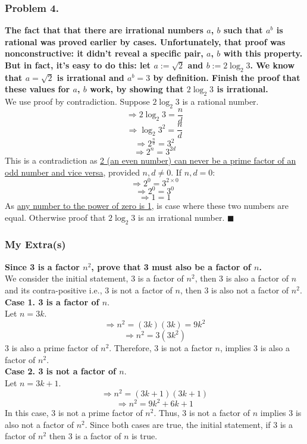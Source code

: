 \documentclass{article}
\begin{document}
\subsubsection{Problem 4.}
\textbf{The fact that that there are irrational numbers $a$, $b$ such that $a^{b}$ is rational was proved earlier by cases. Unfortunately, that proof was nonconstructive: it didn't reveal a specific pair, $a$, $b$ with this property. But in fact, it's easy to do this: let $a := \sqrt{2}$ and $b := 2\log_{2}3$. We know that $a = \sqrt{2}$ is irrational and $a^{b} = 3$ by definition. Finish the proof that these values for $a$, $b$ work, by showing that $2\log_{2}3$ is irrational.}
\\[5pt]
We use proof by contradiction. Suppose $2\log_{2}3$ is a rational number.
\[\Rightarrow 2\log_{2}3 = \frac{n}{d}\]
\[\Rightarrow \log_{2}3^{2} = \frac{n}{d}\]
\[\Rightarrow 2^{\frac{n}{d}} = 3^{2}\]
\[\Rightarrow 2^{n} = 3^{2d}\]
This is a contradiction as \href{https://en.wikipedia.org/wiki/Fundamental_theorem_of_arithmetic}{2 (an even number) can never be a prime factor of an odd number and vice versa}, provided $n, d \neq 0$. If $n, d = 0$: 
\[\Rightarrow 2^{0} = 3^{2 \times 0}\]
\[\Rightarrow 2^{0} = 3^{0}\]
\[\Rightarrow 1 = 1\]
As \href{https://www.homeschoolmath.net/teaching/zero-exponent-proof.php}{any number to the power of zero is 1}, is case where these two numbers are equal. Otherwise proof that $2\log_{2}3$ is an irrational number.
$ \blacksquare $

\subsubsection{My Extra(s)}
\textbf{Since 3 is a factor $n^{2}$, prove that 3 must also be a factor of $n$.}
\\[5pt] 
We consider the initial statement, 3 is a factor of $n^{2}$, then 3 is also a factor of $n$ and its contra-positive i.e., 3 is not a factor of $n$, then 3 is also not a factor of $n^{2}$.
\noindent
\\[5pt]
\textbf{Case 1. 3 is a factor of $n$}.
\\[5pt]
Let $n = 3k$. 
\[\Rightarrow n^{2} = (3k)(3k) = 9k^{2}\]
\[\Rightarrow n^{2} = 3(3k^{2})\]
3 is also a prime factor of $n^{2}$. Therefore, 3 is not a factor $n$, implies 3 is also a factor of $n^{2}$. 
\\[5pt]
\textbf{Case 2. 3 is not a factor of $n$}. 
\\[5pt]
Let $n = 3k + 1$. 
\[\Rightarrow n^{2} = (3k + 1)(3k + 1)\]
\[\Rightarrow n^{2} = 9k^{2} + 6k + 1\]
In this case, 3 is not a prime factor of $n^{2}$. Thus, 3 is not a factor of $n$ implies 3 is also not a factor of $n^{2}$. Since both cases are true, the initial statement, if 3 is a factor of $n^{2}$ then 3 is a factor of $n$ is true.
\end{document}
